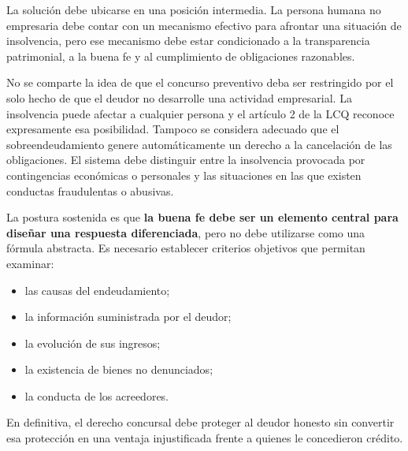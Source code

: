 \documentclass[12pt,oneside]{book}
\begin{document}
La solución debe ubicarse en una posición intermedia. La persona humana no empresaria debe contar con un mecanismo efectivo para afrontar una situación de insolvencia, pero ese mecanismo debe estar condicionado a la transparencia patrimonial, a la buena fe y al cumplimiento de obligaciones razonables.

No se comparte la idea de que el concurso preventivo deba ser restringido por el solo hecho de que el deudor no desarrolle una actividad empresarial. La insolvencia puede afectar a cualquier persona y el artículo 2 de la LCQ reconoce expresamente esa posibilidad. Tampoco se considera adecuado que el sobreendeudamiento genere automáticamente un derecho a la cancelación de las obligaciones. El sistema debe distinguir entre la insolvencia provocada por contingencias económicas o personales y las situaciones en las que existen conductas fraudulentas o abusivas.

La postura sostenida es que \textbf{la buena fe debe ser un elemento central para diseñar una respuesta diferenciada}, pero no debe utilizarse como una fórmula abstracta. Es necesario establecer criterios objetivos que permitan examinar:
\begin{itemize}
    \item las causas del endeudamiento;
    \item la información suministrada por el deudor;
    \item la evolución de sus ingresos;
    \item la existencia de bienes no denunciados;
    \item la conducta de los acreedores.
\end{itemize}

En definitiva, el derecho concursal debe proteger al deudor honesto sin convertir esa protección en una ventaja injustificada frente a quienes le concedieron crédito.
\end{document}

